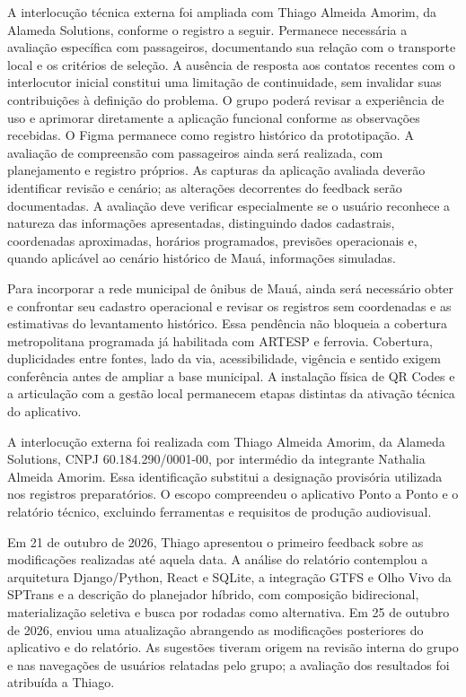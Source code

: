 \documentclass[12pt,oneside,a4paper,brazil,chapter=TITLE]{abntex2}
\begin{document}
A interlocução técnica externa foi ampliada com Thiago Almeida Amorim, da Alameda Solutions, conforme o registro a seguir. Permanece necessária a avaliação específica com passageiros, documentando sua relação com o transporte local e os critérios de seleção. A ausência de resposta aos contatos recentes com o interlocutor inicial constitui uma limitação de continuidade, sem invalidar suas contribuições à definição do problema. O grupo poderá revisar a experiência de uso e aprimorar diretamente a aplicação funcional conforme as observações recebidas. O Figma permanece como registro histórico da prototipação. A avaliação de compreensão com passageiros ainda será realizada, com planejamento e registro próprios. As capturas da aplicação avaliada deverão identificar revisão e cenário; as alterações decorrentes do feedback serão documentadas. A avaliação deve verificar especialmente se o usuário reconhece a natureza das informações apresentadas, distinguindo dados cadastrais, coordenadas aproximadas, horários programados, previsões operacionais e, quando aplicável ao cenário histórico de Mauá, informações simuladas.

Para incorporar a rede municipal de ônibus de Mauá, ainda será necessário obter e confrontar seu cadastro operacional e revisar os registros sem coordenadas e as estimativas do levantamento histórico. Essa pendência não bloqueia a cobertura metropolitana programada já habilitada com ARTESP e ferrovia. Cobertura, duplicidades entre fontes, lado da via, acessibilidade, vigência e sentido exigem conferência antes de ampliar a base municipal. A instalação física de QR Codes e a articulação com a gestão local permanecem etapas distintas da ativação técnica do aplicativo.

\begingroup\setlength{\parskip}{8pt}
A interlocução externa foi realizada com Thiago Almeida Amorim, da Alameda Solutions, CNPJ 60.184.290/0001-00, por intermédio da integrante Nathalia Almeida Amorim. Essa identificação substitui a designação provisória utilizada nos registros preparatórios. O escopo compreendeu o aplicativo Ponto a Ponto e o relatório técnico, excluindo ferramentas e requisitos de produção audiovisual.

Em 21 de outubro de 2026, Thiago apresentou o primeiro feedback sobre as modificações realizadas até aquela data. A análise do relatório contemplou a arquitetura Django/Python, React e SQLite, a integração GTFS e Olho Vivo da SPTrans e a descrição do planejador híbrido, com composição bidirecional, materialização seletiva e busca por rodadas como alternativa. Em 25 de outubro de 2026, enviou uma atualização abrangendo as modificações posteriores do aplicativo e do relatório. As sugestões tiveram origem na revisão interna do grupo e nas navegações de usuários relatadas pelo grupo; a avaliação dos resultados foi atribuída a Thiago.
\end{document}
